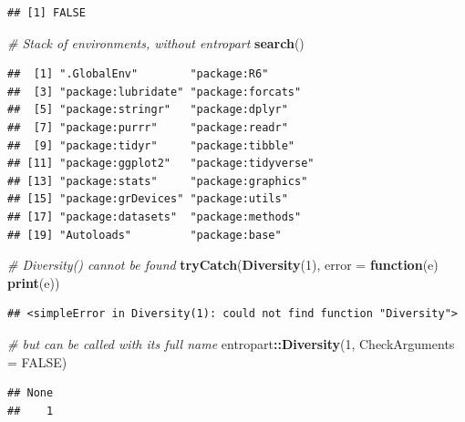 \documentclass[
  12pt,
  american,
  a4paper,
  extrafontsizes,onecolumn,openright
  ]{memoir}
\newenvironment{Shaded}{\begin{snugshade}}{\end{snugshade}}
\newcommand{\AttributeTok}[1]{\textcolor[rgb]{0.13,0.29,0.53}{#1}}
\newcommand{\CommentTok}[1]{\textcolor[rgb]{0.56,0.35,0.01}{\textit{#1}}}
\newcommand{\ConstantTok}[1]{\textcolor[rgb]{0.56,0.35,0.01}{#1}}
\newcommand{\ControlFlowTok}[1]{\textcolor[rgb]{0.13,0.29,0.53}{\textbf{#1}}}
\newcommand{\DecValTok}[1]{\textcolor[rgb]{0.00,0.00,0.81}{#1}}
\newcommand{\FunctionTok}[1]{\textcolor[rgb]{0.13,0.29,0.53}{\textbf{#1}}}
\newcommand{\NormalTok}[1]{#1}
\newcommand{\SpecialCharTok}[1]{\textcolor[rgb]{0.81,0.36,0.00}{\textbf{#1}}}
\begin{document}
\begin{verbatim}
## [1] FALSE
\end{verbatim}

\begin{Shaded}
\begin{Highlighting}[]
\CommentTok{\# Stack of environments, without entropart}
\FunctionTok{search}\NormalTok{()}
\end{Highlighting}
\end{Shaded}

\begin{verbatim}
##  [1] ".GlobalEnv"        "package:R6"       
##  [3] "package:lubridate" "package:forcats"  
##  [5] "package:stringr"   "package:dplyr"    
##  [7] "package:purrr"     "package:readr"    
##  [9] "package:tidyr"     "package:tibble"   
## [11] "package:ggplot2"   "package:tidyverse"
## [13] "package:stats"     "package:graphics" 
## [15] "package:grDevices" "package:utils"    
## [17] "package:datasets"  "package:methods"  
## [19] "Autoloads"         "package:base"
\end{verbatim}

\begin{Shaded}
\begin{Highlighting}[]
\CommentTok{\# Diversity() cannot be found}
\FunctionTok{tryCatch}\NormalTok{(}\FunctionTok{Diversity}\NormalTok{(}\DecValTok{1}\NormalTok{), }\AttributeTok{error =} \ControlFlowTok{function}\NormalTok{(e) }\FunctionTok{print}\NormalTok{(e))}
\end{Highlighting}
\end{Shaded}

\begin{verbatim}
## <simpleError in Diversity(1): could not find function "Diversity">
\end{verbatim}

\begin{Shaded}
\begin{Highlighting}[]
\CommentTok{\# but can be called with its full name}
\NormalTok{entropart}\SpecialCharTok{::}\FunctionTok{Diversity}\NormalTok{(}\DecValTok{1}\NormalTok{, }\AttributeTok{CheckArguments =} \ConstantTok{FALSE}\NormalTok{)}
\end{Highlighting}
\end{Shaded}

\begin{verbatim}
## None 
##    1
\end{verbatim}

\normalsize
\end{document}
